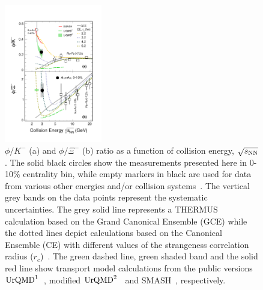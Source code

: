 \documentclass[aps,tightenlines,superscriptaddress,twocolumn]{revtex4-1}
\begin{document}
\begin{figure}
\centering
\hspace*{-4mm}
\includegraphics[width=0.38\textwidth]{fig4_phi_over_kminus_zoomin-eps-converted-to.pdf}
  \caption{$\phi/K^-$ (a) and $\phi/\Xi^-$ (b) ratio as a function of collision energy, $\sqrt{s_{\rm NN}}$. The solid black circles show the measurements presented here in 0-10\% centrality bin, while empty markers in black are used for data from various other energies and/or collision systems~\cite{E917_phi,NA49_phi,FOPI_phi_AlAl,FOPI_phi_NiNi,HADES_phi_ArKCl,HADES_phi_AuAu,Xi_ArKCl_HADES,star_bes_strangeness}. The vertical grey bands on the data points represent the systematic uncertainties. The grey solid line represents a THERMUS calculation based on the Grand Canonical Ensemble (GCE) while the dotted lines depict calculations based on the Canonical Ensemble (CE) with different values of the strangeness correlation radius ($r_c$)~\cite{THERMUS_WHEATON200984,Andronic_2018Naure}. The green dashed line, green shaded band and the solid red line show transport model calculations from the public versions $\textup{UrQMD}^{1}$~\cite{urQMD,UrQMD_2}, modified $\textup{UrQMD}^{2}$~\cite{Steinheimer_2015_UrQMD} and SMASH~\cite{Elfner_SMASH}, respectively.}
\label{fig:phi2Kratio} 
\end{figure}
\end{document}
